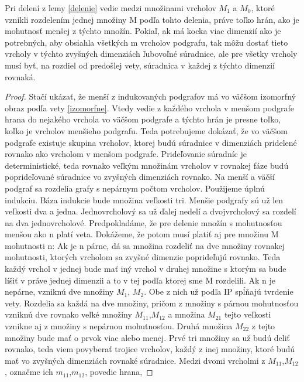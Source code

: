 \begin{lem}
\label{mensia}
Pri delení z lemy \ref{delenie} vedie medzi množinami vrcholov $M_{1}$ a $M_{0}$,
ktoré vznikli rozdelením jednej množiny M podľa tohto delenia, práve toľko
hrán, ako je mohutnosť menšej z týchto množín. Pokiaľ, ak má kocka viac 
dimenzií ako
je potrebných, aby obsiahla všetkých m vrcholov podgrafu, tak môžu dostať
tieto vrcholy v týchto zvyšných dimenziách ľubovoľné súradnice, ale pre
všetky vrcholy musí byť, na rozdiel od predošlej vety, súradnica
 v každej z týchto dimenzií rovnaká.
\end{lem}

\begin{proof}
Stačí ukázať, že menší z indukovaných podgrafov má vo väčšom izomorfný obraz
podľa vety \ref{izomorfne}. Vtedy vedie z každého vrchola v menšom podgrafe
hrana do nejakého vrchola vo väčšom podgrafe a týchto hrán je presne toľko, koľko je
vrcholov menšieho podgrafu.
Teda potrebujeme dokázať, že vo väčšom podgrafe existuje skupina vrcholov,
ktorej budú súradnice v dimenziách pridelené rovnako ako vrcholom v menšom
podgrafe. Prideľovanie súradníc je deterministické, teda rovnako veľkým
množinám vrcholov v rovnakej fáze budú poprideľované súradnice vo zvyšných
dimenziách rovnako. Na menší a väčší podgraf sa rozdelia grafy s nepárnym
počtom vrcholov.
Použijeme úplnú indukciu. Báza indukcie bude množina veľkosti tri. Menšie
podgrafy sú už len veľkosti dva a jedna. Jednovrcholový sa už ďalej nedelí a
dvojvrcholový sa rozdelí na dva jednovrcholové.
Predpokladáme, že pre delenie množín s mohutnosťou menšou ako n platí veta.
Dokážeme, že potom musí platiť aj pre množinu M mohutnosti n: Ak je n párne,
dá sa množina rozdeliť na dve množiny rovnakej mohutnosti, ktorých vrcholom
sa zvyšné dimenzie poprideľujú rovnako. Teda každý vrchol v jednej bude mať
iný vrchol v druhej množine s ktorým sa bude líšiť v práve jednej dimenzii
a to v tej podľa ktorej sme M rozdelili.
Ak n je nepárne, vzniknú dve množiny $M_{1}$, $M_{2}$. Obe z nich už
podľa IP spĺňajú tvrdenie vety. Rozdelia sa každá na dve množiny, pričom z
množiny s párnou mohutnosťou vzniknú dve rovnako veľké množiny
$M_{11}$,$M_{12}$ a množina $M_{21}$
tejto veľkosti vznikne aj z množiny s nepárnou mohutnosťou. Druhá množina
$M_{22}$ z tejto množiny bude mať o prvok viac alebo menej.
Prvé tri množiny sa už budú deliť rovnako, teda viem povyberať trojice
vrcholov, každý z inej množiny, ktoré budú mať vo zvyšných dimenziách
rovnaké súradnice. Medzi dvomi vrcholmi z $M_{11}$,$M_{12}$, označme ich 
$m_{11}$,$m_{12}$,  povedie hrana,

\end{proof}
